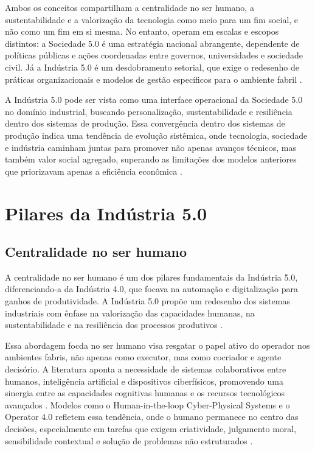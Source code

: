 Ambos os conceitos compartilham a centralidade no ser humano, a sustentabilidade e a valorização da tecnologia como meio para um fim social, e não como um fim em si mesma.
No entanto, operam em escalas e escopos distintos: a Sociedade 5.0 é uma estratégia nacional abrangente, dependente de políticas públicas e ações coordenadas entre governos, universidades e sociedade civil.
Já a Indústria 5.0 é um desdobramento setorial, que exige o redesenho de práticas organizacionais e modelos de gestão específicos para o ambiente fabril \cite{PIZON2023, TOTH2023}.

A Indústria 5.0 pode ser vista como uma interface operacional da Sociedade 5.0 no domínio industrial, buscando personalização, sustentabilidade e resiliência dentro dos sistemas de produção.
Essa convergência dentro dos sistemas de produção indica uma tendência de evolução sistêmica, onde tecnologia, sociedade e indústria caminham juntas para promover não apenas avanços técnicos, mas também valor social agregado, superando as limitações dos modelos anteriores que priorizavam apenas a eficiência econômica \cite{VALETTE2023}.

\section{Pilares da Indústria 5.0}
\subsection{Centralidade no ser humano}

A centralidade no ser humano é um dos pilares fundamentais da Indústria 5.0, diferenciando-a da Indústria 4.0, que focava na automação e digitalização para ganhos de produtividade.
A Indústria 5.0 propõe um redesenho dos sistemas industriais com ênfase na valorização das capacidades humanas, na sustentabilidade e na resiliência dos processos produtivos \cite{VALETTE2023, euCommission2021}.

Essa abordagem focda no ser humano visa resgatar o papel ativo do operador nos ambientes fabris, não apenas como executor, mas como cocriador e agente decisório.
A literatura aponta a necessidade de sistemas colaborativos entre humanos, inteligência artificial e dispositivos ciberfísicos, promovendo uma sinergia entre as capacidades cognitivas humanas e os recursos tecnológicos avançados \cite{TOTH2023, Santana_2023}.
Modelos como o Human-in-the-loop Cyber-Physical Systems e o Operator 4.0 refletem essa tendência, onde o humano permanece no centro das decisões, especialmente em tarefas que exigem criatividade, julgamento moral, sensibilidade contextual e solução de problemas não estruturados \cite{VALETTE2023, RANNERTSHAUSER2022}.

